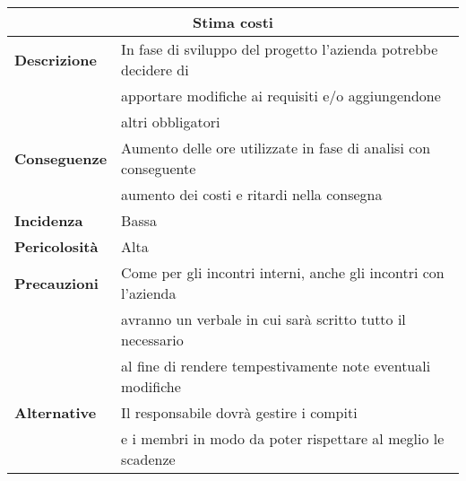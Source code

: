 \begin{center}
    \begin{tabularx}{0.8\linewidth}{l|l}
        \multicolumn{2}{c}{\textbf{Stima costi}}                                                               \\
        \hline{\textbf{Descrizione}}    & In fase di sviluppo del progetto l'azienda potrebbe decidere di      \\
                                        & apportare modifiche ai requisiti e/o aggiungendone                   \\
                                        & altri obbligatori                                                    \\                                 
        \textbf{Conseguenze}            & Aumento delle ore utilizzate in fase di analisi con conseguente      \\
                                        & aumento dei costi e ritardi nella consegna                           \\
        \textbf{Incidenza}              & Bassa                                                                \\
        \textbf{Pericolosità}           & Alta                                                                 \\
        \textbf{Precauzioni}            & Come per gli incontri interni, anche gli incontri con l'azienda      \\
                                        & avranno un verbale in cui sarà scritto tutto il necessario           \\
                                        & al fine di rendere tempestivamente note eventuali modifiche          \\
        \textbf{Alternative}            & Il responsabile dovrà gestire i compiti                              \\
                                        & e i membri in modo da poter rispettare al meglio le scadenze         \\ 
    \end{tabularx}
\end{center}
